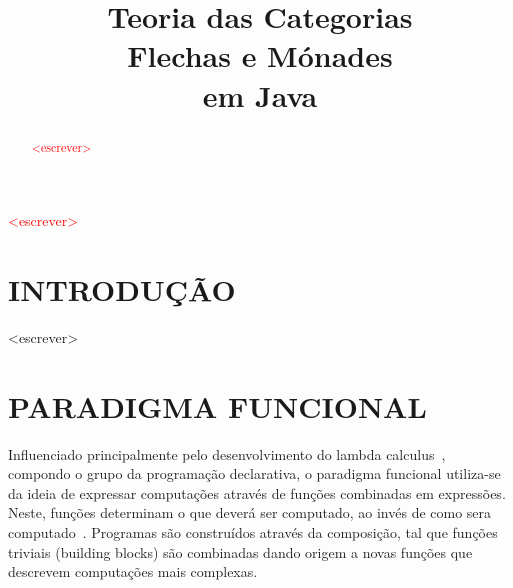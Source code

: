 \documentclass[10pt, conference]{IEEEtran}
\begin{document}

\title { 
	Teoria das Categorias \\
	Flechas e Mónades \\
	em Java 
}

\author{

}
					  
\maketitle

\thispagestyle{plain}
\pagestyle{plain}

\begin{abstract}

\textcolor{red}{<escrever>}

\end{abstract}

\begin{IEEEkeywords}

\textcolor{red}{<escrever>}

\end{IEEEkeywords}

\section{INTRODUÇÃO}
\label{sec:intro}

<escrever>

\section{PARADIGMA FUNCIONAL}
\label{sec:func-para}

Influenciado principalmente pelo desenvolvimento do lambda calculus~\cite{hudak1989conception}, compondo o grupo da programação declarativa, o paradigma funcional utiliza-se da ideia de expressar computações através de funções combinadas em expressões. Neste, funções determinam o que deverá ser computado, ao invés de como sera computado~\cite{louden2011programming}. Programas são construídos através da composição, tal que funções triviais (building blocks) são combinadas dando origem a novas funções que descrevem computações mais complexas.
\end{document}

